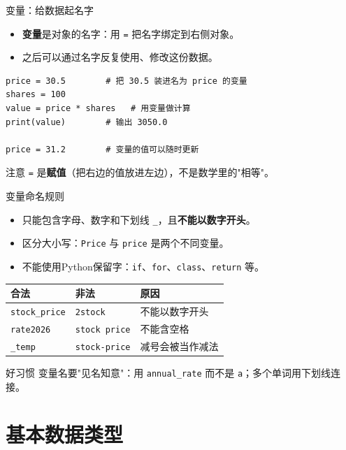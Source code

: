 \documentclass[9pt]{ctexbeamer}
\begin{document}
\begin{frame}[fragile]{变量：给数据起名字}
	\begin{itemize}
		\item \textbf{变量}是对象的名字：用 \texttt{=} 把名字绑定到右侧对象。
		\item 之后可以通过名字反复使用、修改这份数据。
	\end{itemize}
	\begin{lstlisting}
price = 30.5        # 把 30.5 装进名为 price 的变量
shares = 100
value = price * shares   # 用变量做计算
print(value)        # 输出 3050.0

price = 31.2        # 变量的值可以随时更新
\end{lstlisting}
	\begin{alertblock}{注意}
		\texttt{=} 是\textbf{赋值}（把右边的值放进左边），不是数学里的"相等"。
	\end{alertblock}
\end{frame}

\begin{frame}{变量命名规则}
	\begin{itemize}
		\item 只能包含字母、数字和下划线 \texttt{\_}，且\textbf{不能以数字开头}。
		\item 区分大小写：\texttt{Price} 与 \texttt{price} 是两个不同变量。
		\item 不能使用Python保留字：\texttt{if}、\texttt{for}、\texttt{class}、\texttt{return} 等。
	\end{itemize}
	\begin{table}
		\centering
		\begin{tabular}{lll}
			\toprule
			合法 & 非法 & 原因 \\
			\midrule
			\texttt{stock\_price} & \texttt{2stock} & 不能以数字开头 \\
			\texttt{rate2026} & \texttt{stock price} & 不能含空格 \\
			\texttt{\_temp} & \texttt{stock-price} & 减号会被当作减法 \\
			\bottomrule
		\end{tabular}
	\end{table}
	\begin{exampleblock}{好习惯}
		变量名要"见名知意"：用 \texttt{annual\_rate} 而不是 \texttt{a}；多个单词用下划线连接。
	\end{exampleblock}
\end{frame}


\section{基本数据类型}
\end{document}
